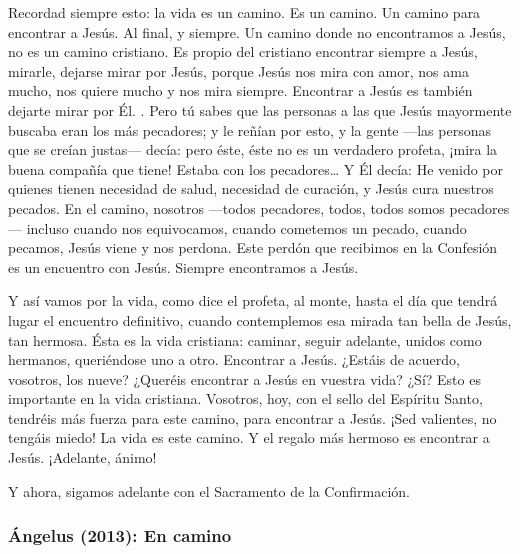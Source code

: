 \begin{body}
					Recordad siempre esto: la vida es un camino. Es un camino. Un camino para encontrar a Jesús. Al final, y siempre. Un camino donde no encontramos a Jesús, no es un camino cristiano. Es propio del cristiano encontrar siempre a Jesús, mirarle, dejarse mirar por Jesús, porque Jesús nos mira con amor, nos ama mucho, nos quiere mucho y nos mira siempre. Encontrar a Jesús es también dejarte mirar por Él. . Pero tú sabes que las personas a las que Jesús mayormente buscaba eran los más pecadores; y le reñían por esto, y la gente ---las personas que se creían justas--- decía: pero éste, éste no es un verdadero profeta, ¡mira la buena compañía que tiene! Estaba con los pecadores\ldots{} Y Él decía: He venido por quienes tienen necesidad de salud, necesidad de curación, y Jesús cura nuestros pecados. En el camino, nosotros ---todos pecadores, todos, todos somos pecadores--- incluso cuando nos equivocamos, cuando cometemos un pecado, cuando pecamos, Jesús viene y nos perdona. Este perdón que recibimos en la Confesión es un encuentro con Jesús. Siempre encontramos a Jesús. 
					
					Y así vamos por la vida, como dice el profeta, al monte, hasta el día que tendrá lugar el encuentro definitivo, cuando contemplemos esa mirada tan bella de Jesús, tan hermosa. Ésta es la vida cristiana: caminar, seguir adelante, unidos como hermanos, queriéndose uno a otro. Encontrar a Jesús. ¿Estáis de acuerdo, vosotros, los nueve? ¿Queréis encontrar a Jesús en vuestra vida? ¿Sí? Esto es importante en la vida cristiana. Vosotros, hoy, con el sello del Espíritu Santo, tendréis más fuerza para este camino, para encontrar a Jesús. ¡Sed valientes, no tengáis miedo! La vida es este camino. Y el regalo más hermoso es encontrar a Jesús. ¡Adelante, ánimo! 
					
					Y ahora, sigamos adelante con el Sacramento de la Confirmación.
				\end{body}
			
			\subsubsection{Ángelus (2013): En camino}
			
				
